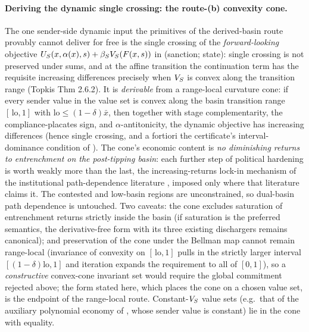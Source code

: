 \paragraph{Deriving the dynamic single crossing: the route-(b)
convexity cone.} The one sender-side dynamic input the
primitives of the derived-basin route provably cannot deliver for free is the
single crossing of the \emph{forward-looking} objective
$U_S(x,\alpha(x),s)+\beta_SV_S(F(x,s))$ in (sanction; state):
single crossing is not preserved under sums, and at the affine
transition the continuation term has the requisite increasing
differences precisely when $V_S$ is convex along the transition
range (Topkis Thm 2.6.2). It is \emph{derivable} from a
range-local curvature cone: if every sender value in the value set is
convex along the basin transition range $[\,\mathrm{lo},1]$ with
$\mathrm{lo}\le(1-\delta)\bar x$, then together with stage
complementarity, the compliance-placates sign, and
$\alpha$-antitonicity, the dynamic objective has increasing
differences (hence single crossing, and a fortiori the certificate's
interval-dominance condition of ).
The cone's economic content is \emph{no diminishing returns to
entrenchment on the post-tipping basin}: each further step of
political hardening is worth weakly more than the last, the
increasing-returns lock-in mechanism of the institutional
path-dependence literature \citep{Pierson2000}, imposed only where
that literature claims it. The contested and low-basin regions are
unconstrained, so dual-basin path dependence is untouched. Two caveats:
the cone excludes saturation of entrenchment returns strictly
inside the basin (if saturation is the preferred semantics, the
derivative-free form with its three existing dischargers remains canonical);
and preservation of the cone under the Bellman map cannot remain
range-local (invariance of convexity on $[\,\mathrm{lo},1]$ pulls in
the strictly larger interval $[(1-\delta)\mathrm{lo},1]$ and
iteration expands the requirement to all of $[0,1]$), so a
\emph{constructive} convex-cone invariant set would require the global
commitment rejected above; the form stated here, which places the cone on a chosen value set, is
the endpoint of the range-local route.
Constant-$V_S$ value sets (e.g.\ that of the auxiliary polynomial economy of
, whose sender value is constant) lie in the cone
with equality.

